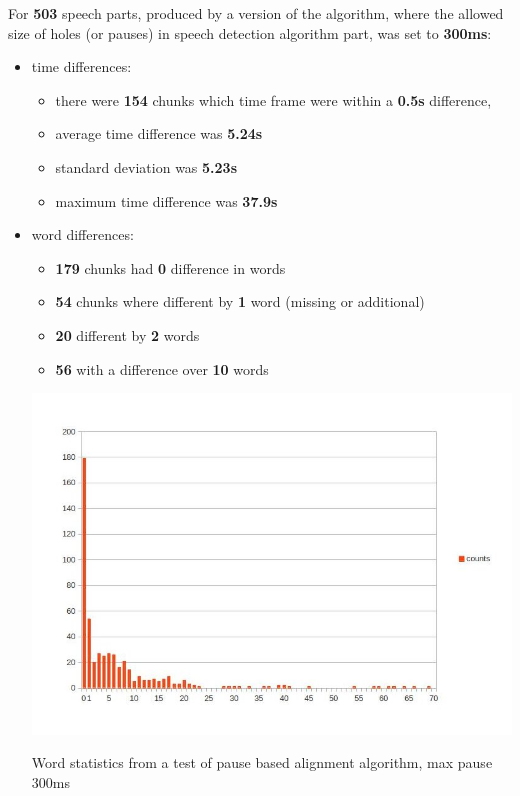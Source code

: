 \documentclass[12pt,a4paper,english]{article}
\begin{document}
\newpage
For \textbf{503} speech parts, produced by a version of the algorithm, where the allowed size of holes (or pauses) in speech detection algorithm part,
was set to \textbf{300ms}:
\begin{itemize}
    \item time differences:
    \begin{itemize}
        \item there were \textbf{154} chunks which time frame were within a \textbf{0.5s} difference, 
        \item average time difference was \textbf{5.24s}
        \item standard deviation was \textbf{5.23s}
        \item maximum time difference was \textbf{37.9s}
    \end{itemize}
    \item word differences:
    \begin{itemize}
        \item \textbf{179} chunks had \textbf{0} difference in words
        \item \textbf{54} chunks where different by \textbf{1} word (missing or additional)
        \item \textbf{20} different by \textbf{2} words
        \item \textbf{56} with a difference over \textbf{10} words
    \end{itemize}
    \begin{center}
        \includegraphics[scale=0.6]{length_based_results_worse.jpg}
        \caption[]{Word statistics from a test of pause based alignment algorithm, max pause 300ms}
    \end {center}
\end{itemize}
\end{document}
